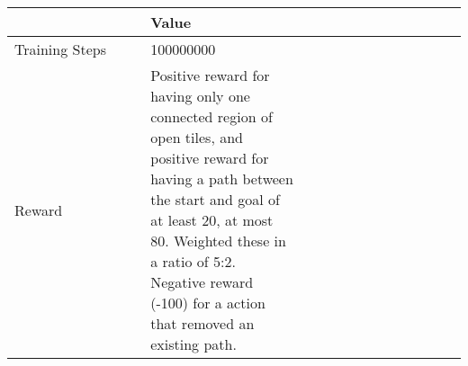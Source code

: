 \begin{tabular}{p{0.3\linewidth}p{0.35\linewidth}p{0.35\linewidth}}
\toprule
{} &                                                                                                                                                                                                                                                                  Value \\
\midrule
Training Steps &                                                                                                                                                                                                                                                              100000000 \\
Reward         &  Positive reward for having only one connected region of open tiles, and positive reward for having a path between the start and goal of at least 20, at most 80. Weighted these in a ratio of 5:2. Negative reward (-100) for a action that removed an existing path. \\
\bottomrule
\end{tabular}
